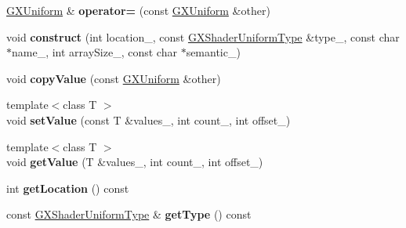 \begin{DoxyCompactItemize}
\item 
\hyperlink{class_magnum_1_1_g_x_uniform}{G\+X\+Uniform} \& {\bfseries operator=} (const \hyperlink{class_magnum_1_1_g_x_uniform}{G\+X\+Uniform} \&other)\hypertarget{class_magnum_1_1_g_x_uniform_a36985cccca56d88875ad101823e7179b}{}\label{class_magnum_1_1_g_x_uniform_a36985cccca56d88875ad101823e7179b}

\item 
void {\bfseries construct} (int location\+\_\+, const \hyperlink{class_magnum_1_1_g_x_shader_uniform_type}{G\+X\+Shader\+Uniform\+Type} \&type\+\_\+, const char $\ast$name\+\_\+, int array\+Size\+\_\+, const char $\ast$semantic\+\_\+)\hypertarget{class_magnum_1_1_g_x_uniform_a02ce24bbc2b6c6cecf9251e621e141a2}{}\label{class_magnum_1_1_g_x_uniform_a02ce24bbc2b6c6cecf9251e621e141a2}

\item 
void {\bfseries copy\+Value} (const \hyperlink{class_magnum_1_1_g_x_uniform}{G\+X\+Uniform} \&other)\hypertarget{class_magnum_1_1_g_x_uniform_a7bd36eba67f47a0ab30c449309106834}{}\label{class_magnum_1_1_g_x_uniform_a7bd36eba67f47a0ab30c449309106834}

\item 
{\footnotesize template$<$class T $>$ }\\void {\bfseries set\+Value} (const T \&values\+\_\+, int count\+\_, int offset\+\_)\hypertarget{class_magnum_1_1_g_x_uniform_a96b993e6adff19edf76921869de798bd}{}\label{class_magnum_1_1_g_x_uniform_a96b993e6adff19edf76921869de798bd}

\item 
{\footnotesize template$<$class T $>$ }\\void {\bfseries get\+Value} (T \&values\+\_\+, int count\+\_, int offset\+\_)\hypertarget{class_magnum_1_1_g_x_uniform_a66f66e793cd709654b9aa0d553e4dccf}{}\label{class_magnum_1_1_g_x_uniform_a66f66e793cd709654b9aa0d553e4dccf}

\item 
int {\bfseries get\+Location} () const \hypertarget{class_magnum_1_1_g_x_uniform_a2210193704566baea9a7238427a80fa6}{}\label{class_magnum_1_1_g_x_uniform_a2210193704566baea9a7238427a80fa6}

\item 
const \hyperlink{class_magnum_1_1_g_x_shader_uniform_type}{G\+X\+Shader\+Uniform\+Type} \& {\bfseries get\+Type} () const \hypertarget{class_magnum_1_1_g_x_uniform_ab20b6c510f128968eede2a79f1793307}{}\label{class_magnum_1_1_g_x_uniform_ab20b6c510f128968eede2a79f1793307}


\end{DoxyCompactItemize}
